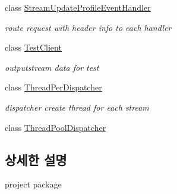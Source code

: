 \begin{DoxyCompactItemize}
class \hyperlink{classweek8__server_1_1_stream_update_profile_event_handler}{Stream\-Update\-Profile\-Event\-Handler}
\begin{DoxyCompactList}\small\item\em route request with header info to each handler \end{DoxyCompactList}\item 
class \hyperlink{classweek8__server_1_1_test_client}{Test\-Client}
\begin{DoxyCompactList}\small\item\em outputstream data for test \end{DoxyCompactList}\item 
class \hyperlink{classweek8__server_1_1_thread_per_dispatcher}{Thread\-Per\-Dispatcher}
\begin{DoxyCompactList}\small\item\em dispatcher create thread for each stream \end{DoxyCompactList}\item 
class \hyperlink{classweek8__server_1_1_thread_pool_dispatcher}{Thread\-Pool\-Dispatcher}
\end{DoxyCompactItemize}


\subsection{상세한 설명}
project package 